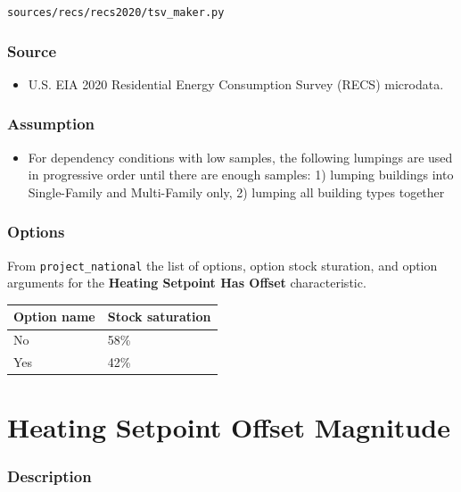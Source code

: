 \texttt{sources/recs/recs2020/tsv\_maker.py}

\subsubsection{Source}\label{source-87}

\begin{itemize}
 
\item
  U.S. EIA 2020 Residential Energy Consumption Survey (RECS) microdata.
\end{itemize}

\subsubsection{Assumption}\label{assumption-52}

\begin{itemize}
 
\item
  For dependency conditions with low samples, the following lumpings are
  used in progressive order until there are enough samples: 1) lumping
  buildings into Single-Family and Multi-Family only, 2) lumping all
  building types together
\end{itemize}

\subsubsection{Options}\label{options-88}

From \texttt{project\_national} the list of options, option stock
sturation, and option arguments for the \textbf{Heating Setpoint Has
Offset} characteristic.

\begin{longtable}[]{@{}ll@{}}
\toprule\noalign{}
Option name & Stock saturation \\
\midrule\noalign{}
\endhead
\bottomrule\noalign{}
\endlastfoot
No & 58\% \\
Yes & 42\% \\
\end{longtable}

\section{Heating Setpoint Offset
Magnitude}\label{heating_setpoint_offset_magnitude}

\subsubsection{Description}\label{description-89}

